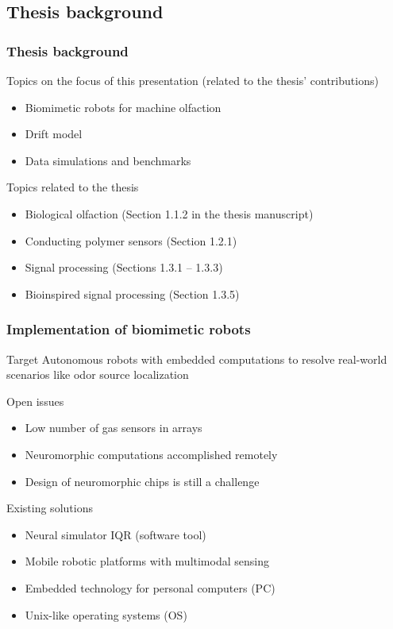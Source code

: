 \documentclass{beamer}              %
\begin{document}
\subsection{Thesis background}

\begin{frame}
\frametitle{Thesis background}

Topics on the focus of this presentation
{\scriptsize (related to the thesis' contributions)}

\begin{itemize}
  \item Biomimetic robots for machine olfaction
  \item Drift model
  \item Data simulations and benchmarks
\end{itemize}

\vspace{0.05\linewidth}

Topics related to the thesis
\begin{itemize}
  \item Biological olfaction (Section 1.1.2 in the thesis manuscript)
  \item Conducting polymer sensors (Section 1.2.1)
  \item Signal processing (Sections 1.3.1 -- 1.3.3) 
  \item Bioinspired signal processing (Section 1.3.5)
\end{itemize}
\end{frame}

\begin{frame}
\frametitle{Implementation of biomimetic robots}

\begin{minipage}{0.9\textwidth}
\begin{block}{Target}
  Autonomous robots with embedded computations
  to resolve real-world scenarios like odor source localization
\end{block}
\end{minipage}

\vspace{0.05\linewidth}

Open issues
\begin{itemize}
  \item Low number of gas sensors in arrays
  \item Neuromorphic computations accomplished remotely
  \item Design of neuromorphic chips is still a challenge
\end{itemize}

\vspace{0.05\linewidth}

Existing solutions
\begin{itemize}
  \item Neural simulator IQR (software tool)
  \item Mobile robotic platforms with multimodal sensing
  \item Embedded technology for personal computers (PC)
  \item Unix-like operating systems (OS)
\end{itemize}
\end{frame}
\end{document}
